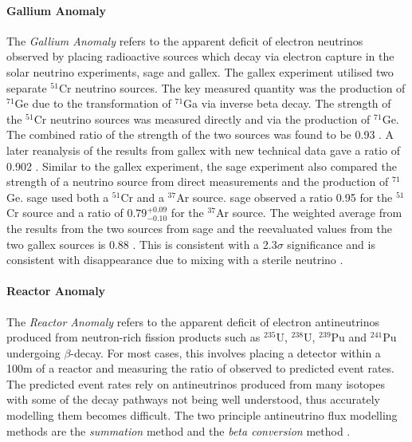 \newpage
\paragraph{Gallium Anomaly}
The \textit{Gallium Anomaly} refers to the apparent deficit of electron neutrinos observed by placing radioactive sources which decay via electron capture in the solar neutrino experiments, \gls{sage} and \gls{gallex}. The \gls{gallex} experiment utilised two separate $^{51}$Cr neutrino sources. The key measured quantity was the production of $^{71}$Ge due to the transformation of $^{71}$Ga via inverse beta decay. The strength of the $^{51}$Cr neutrino sources was measured directly and via the production of $^{71}$Ge. The combined ratio of the strength of the two sources was found to be 0.93 \cite{GALLEX}. A later reanalysis of the results from \gls{gallex} with new technical data gave a ratio of 0.902 \cite{Gallex_reanalysis}. Similar to the \gls{gallex} experiment, the \gls{sage} experiment also compared the strength of a neutrino source from direct measurements and the production of $^{71}$Ge. \gls{sage} used both a $^{51}$Cr and a $^{37}$Ar source.  \gls{sage} observed a ratio 0.95 for the $^{51}$Cr source and a ratio of $0.79^{+0.09}_{-0.10}$ for the $^{37}$Ar source. The weighted average from the results from the two sources from \gls{sage} and the reevaluated values from the two \gls{gallex} sources is 0.88 \cite{SAGE}. This is consistent with a 2.3$\sigma$ significance and is consistent with \nuebar disappearance due to mixing with a sterile neutrino \cite{gallium_anomaly}.

\paragraph{Reactor Anomaly}
The \textit{Reactor Anomaly} refers to the apparent deficit of electron antineutrinos produced from neutron-rich fission products such as $^{235}$U, $^{238}$U, $^{239}$Pu and $^{241}$Pu undergoing  $\beta$-decay. For most cases, this involves placing a detector within a 100m of a reactor and measuring the ratio of observed to predicted event rates. The predicted event rates rely on antineutrinos produced from many isotopes with some of the decay pathways not being well understood, thus accurately modelling them becomes difficult. The two principle antineutrino flux modelling methods are the \textit{summation} method and the \textit{beta conversion} method \cite{Reactor_anomaly}\cite{snowmass_2021}.
 
